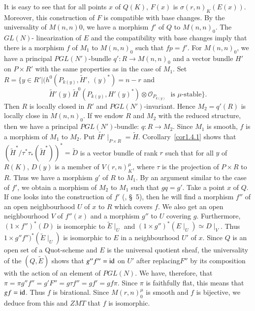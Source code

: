 \begin{Proof}
It is easy to see that for all points $x$ of $Q(K)$, $F(x)$ is
$\sigma(r,n)_K (E(x))$. Moreover, this construction of $F$ is
compatible with base changes. By the universality of $M(n,n)0$, we
have a morphism $f'$ of $Q$ to $M(n,n)_0$. The $GL(N)$- linearization
of $E$ and the compatibility with base changes imply that there is a
morphism $f$ of $M_1$ to $M(n,n)_0$ such that $fp=f'$. For $M(n,n)_0$,
we have a principal $PGL(N')$-bundle $q':R\to M(n,n)_0$ and a vector
bundle $H'$ on $P\times R'$ with the same properties as in the case of
$M_1$. Set 
$R=\{ y\in R'|
(h^{0}(P_{k(y)},\widetilde{H}', \ (y)^{\ast})=n-r$
and
$$
\widetilde{H}'(y)\widetilde{H}^{0}(P_{k(y)},H'(y)^{\ast})\otimes
\mathscr{O}_{P_{k(y)}} \text{~ is $\mu$-stable$\}$.}
$$ 
Then $R$
is locally closed in $R'$ and $PGL(N')$-invariant. Hence $M_2=q'(R)$
is locally close in $M(n,n)_0$. If we endow $R$ and $M_2$ with the
reduced structure, then we have a principal $PGL(N')$-bundle: $q:R\to
M_2$. Since $M_1$ is smooth, $f$ is a morphism of $M_1$ to $M_2$. Put
$\widetilde{H'}\mid_{P\times
  R}=\widetilde{H}$. Corollary~\ref{cor1.4.1} shows that
$\left(\widetilde{H}^{\ast}/\tau^{\ast}\tau_{\ast}(\widetilde{H}^{\ast})\right)^{\ast}=\widetilde{D}$
is a vector bundle of rank $r$ such that for all $y$ of $R(K)$, $D(y)$
is a member of $V(r,n)^{\mu}_K$, where $\tau$ is the projection of
$P\times R$ to $R$. Thus we have a morphism $g'$ of $R$ to $M_1$. By
an argument similar to the case of $f'$, we obtain a morphism of $M_2$
to $M_1$ such that $gq=g'$. Take a point $x$ of $Q$. If one looks into
the construction of $f'$ (\cite{key9}, \S\ 5), then he will find a
morphism $f''$ of an open neighbourhood $U$ of $x$ to $R$ which covers
$f$. We also get an open neighbourhood $V$ of $f''(x)$ and a morphism
$g''$ to $U$ covering $g$. Furthermore, $(1\times f'')^{\ast}(D)$ is
isomorphic to $\widetilde{E}\mid_U$ and $(1\times
g'')^{\ast}(E\mid_U)\simeq D\mid_V$. Thus $1\times
g''f'')^{\ast}\left(\widetilde{E}\mid_U\right)$ is isomorphic to $E$
in a neighbourhood $U'$ of $x$. Since $Q$ is an open set of a
Quot-scheme and $E$ is the universal quotient sheaf, the universality
of the $\left(Q,\widetilde{E}\right)$ shows that $g''f''=\operatorname{id}$ on $U'$
after replacing\pageoriginale $F''$ by its composition with the action
of an element 
of $PGL(N)$. We have, therefore, that
$\pi=\pi g''f''=g'F''=g\tau f''=gf'=gf\pi$. Since $\pi$ is faithfully
flat, this means that $gf=\operatorname{id}$. Thus $f$ is birational. Since
$M(r,n)^{\mu}_0$ is smooth and $f$ is bijective, we deduce from this
and $ZMT$ that $f$ is isomorphic.
\enprf
\end{Proof}

